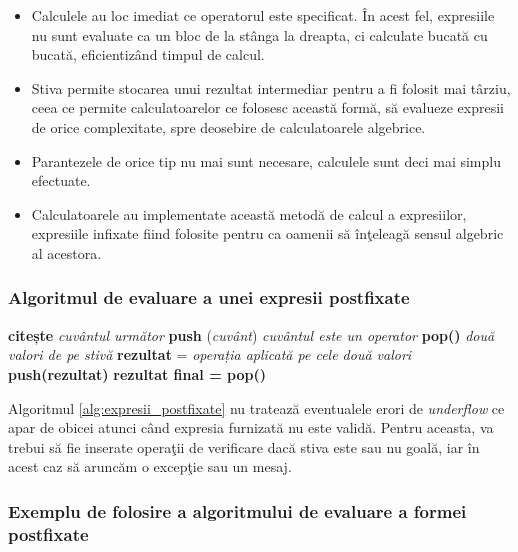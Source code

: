 \begin{itemize}
	\item Calculele au loc imediat ce operatorul este specificat. În acest fel, expresiile nu sunt evaluate ca un bloc de la stânga la dreapta, ci calculate bucată cu bucată, eficientizând timpul de
	calcul.
	\item Stiva permite stocarea unui rezultat intermediar pentru a fi folosit mai târziu, ceea ce permite calculatoarelor ce folosesc această formă, să evalueze expresii de orice complexitate, spre deosebire de calculatoarele algebrice.
	\item Parantezele de orice tip nu mai sunt necesare, calculele sunt deci mai simplu efectuate.
	\item Calculatoarele au implementate această metodă de calcul a expresiilor, expresiile infixate fiind folosite pentru ca oamenii să înţeleagă sensul algebric al acestora.
\end{itemize}

\subsubsection{Algoritmul de evaluare a unei expresii postfixate}

\begin{algorithm} [H]
	\caption{}\label{alg:expresii_postfixate}
	\begin{algorithmic}[1]
		\State \textbf{citește} \textit{cuvântul următor}	
		\State \textbf{push} (\textit{cuvânt})	
		\Else \textit{ cuvântul este un operator}
		\State \textbf{pop()} \textit{două valori de pe stivă}
		\State \textbf{rezultat} = \textit{operația aplicată pe cele două valori}
		\State \textbf{push(rezultat)}
		\EndIf		
		\EndWhile
		\State \textbf{rezultat final = pop()}			
	\end{algorithmic}
\end{algorithm}

Algoritmul \ref{alg:expresii_postfixate} nu tratează eventualele erori de \textit{underflow} ce apar de obicei atunci când expresia furnizată nu este validă.
Pentru aceasta, va trebui să fie inserate operaţii de verificare dacă stiva este sau nu goală, iar în acest caz să aruncăm o excepţie sau un mesaj.

\subsubsection{Exemplu de folosire a algoritmului de evaluare a formei postfixate}

